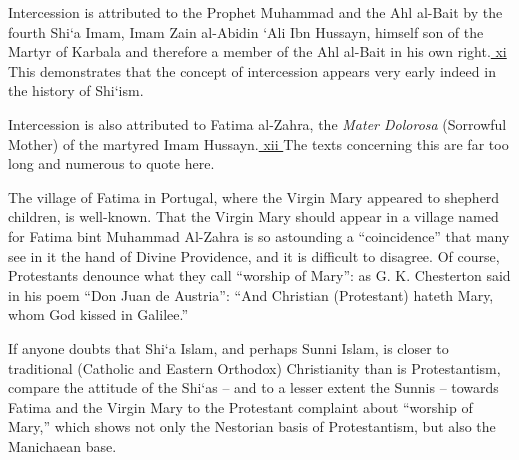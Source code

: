 

Intercession is attributed to the Prophet Muhammad and the Ahl al-Bait by the fourth Shi`a Imam, Imam Zain al-Abidin `Ali Ibn Hussayn, himself son of the Martyr of Karbala and therefore a member of the Ahl al-Bait in his own right.\hyperref[_edn11]{ xi } This demonstrates that the concept of intercession appears very early indeed in the history of Shi`ism.

Intercession is also attributed to Fatima al-Zahra, the \emph{Mater Dolorosa} (Sorrowful Mother) of the martyred Imam Hussayn.\hyperref[_edn12]{ xii } The texts concerning this are far too long and numerous to quote here.

The village of Fatima in Portugal, where the Virgin Mary appeared to shepherd children, is well-known. That the Virgin Mary should appear in a village named for Fatima bint Muhammad Al-Zahra is so astounding a ``coincidence'' that many see in it the hand of Divine Providence, and it is difficult to disagree. Of course, Protestants denounce what they call ``worship of Mary'': as G. K. Chesterton said in his poem ``Don Juan de Austria'': ``And Christian (Protestant) hateth Mary, whom God kissed in Galilee.''

If anyone doubts that Shi`a Islam, and perhaps Sunni Islam, is closer to traditional (Catholic and Eastern Orthodox) Christianity than is Protestantism, compare the attitude of the Shi`as -- and to a lesser extent the Sunnis -- towards Fatima and the Virgin Mary to the Protestant complaint about ``worship of Mary,'' which shows not only the Nestorian basis of Protestantism, but also the Manichaean base.

